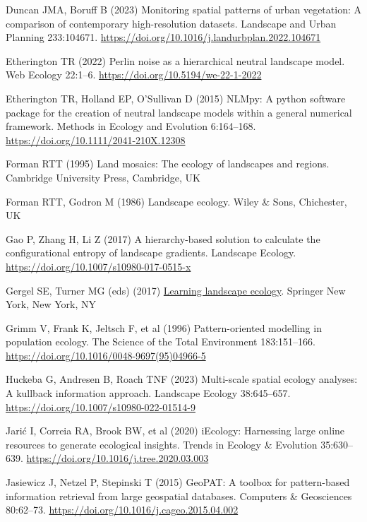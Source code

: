 \documentclass[
  12pt,
  a4paperpaper,
]{article}
\newlength{\cslhangindent}
\newenvironment{CSLReferences}[2] %
 {\begin{list}{}{%
  \setlength{\itemindent}{0pt}
  \setlength{\leftmargin}{0pt}
  \setlength{\parsep}{0pt}
  \ifodd #1
   \setlength{\leftmargin}{\cslhangindent}
   \setlength{\itemindent}{-1\cslhangindent}
  \fi
  \setlength{\itemsep}{#2\baselineskip}}}
 {\end{list}}
\begin{document}
\begin{CSLReferences}{1}{1}
Duncan JMA, Boruff B (2023) Monitoring spatial patterns of urban
vegetation: A comparison of contemporary high-resolution datasets.
Landscape and Urban Planning 233:104671.
\url{https://doi.org/10.1016/j.landurbplan.2022.104671}

Etherington TR (2022) Perlin noise as a hierarchical neutral landscape
model. Web Ecology 22:1--6. \url{https://doi.org/10.5194/we-22-1-2022}

Etherington TR, Holland EP, O'Sullivan D (2015) NLMpy: A python software
package for the creation of neutral landscape models within a general
numerical framework. Methods in Ecology and Evolution 6:164--168.
\url{https://doi.org/10.1111/2041-210X.12308}

Forman RTT (1995) Land mosaics: The ecology of landscapes and regions.
Cambridge University Press, Cambridge, UK

Forman RTT, Godron M (1986) Landscape ecology. Wiley \& Sons,
Chichester, UK

Gao P, Zhang H, Li Z (2017) A hierarchy-based solution to calculate the
configurational entropy of landscape gradients. Landscape Ecology.
\url{https://doi.org/10.1007/s10980-017-0515-x}

Gergel SE, Turner MG (eds) (2017)
\href{https://doi.org/10.1007/978-1-4939-6374-4}{Learning landscape
ecology}. Springer New York, New York, NY

Grimm V, Frank K, Jeltsch F, et al (1996) Pattern-oriented modelling in
population ecology. The Science of the Total Environment 183:151--166.
\url{https://doi.org/10.1016/0048-9697(95)04966-5}

Huckeba G, Andresen B, Roach TNF (2023) Multi-scale spatial ecology
analyses: A kullback information approach. Landscape Ecology
38:645--657. \url{https://doi.org/10.1007/s10980-022-01514-9}

Jarić I, Correia RA, Brook BW, et al (2020) iEcology: Harnessing large
online resources to generate ecological insights. Trends in Ecology \&
Evolution 35:630--639. \url{https://doi.org/10.1016/j.tree.2020.03.003}

Jasiewicz J, Netzel P, Stepinski T (2015) GeoPAT: A toolbox for
pattern-based information retrieval from large geospatial databases.
Computers \& Geosciences 80:62--73.
\url{https://doi.org/10.1016/j.cageo.2015.04.002}


\end{CSLReferences}
\end{document}
